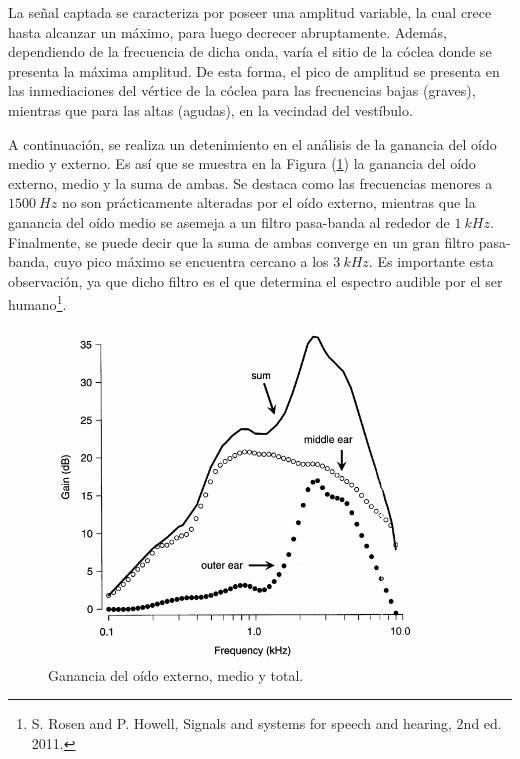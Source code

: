 \documentclass[a4paper]{article}
\begin{document}
La señal captada se caracteriza por poseer una amplitud variable, la cual crece hasta alcanzar un máximo, para luego decrecer abruptamente. Además, dependiendo de la frecuencia de dicha onda, varía el sitio de la cóclea donde se presenta la máxima amplitud. De esta forma, el pico de amplitud se presenta en las inmediaciones del vértice de la cóclea para las frecuencias bajas (graves), mientras que para las altas (agudas), en la vecindad del vestíbulo.

A continuación, se realiza un detenimiento en el análisis de la ganancia del oído medio y externo. Es así que se muestra en la Figura (\ref{fig:oidoganancia}) la ganancia del oído externo, medio y la suma de ambas. Se destaca como las frecuencias menores a $1500 \ Hz$ no son prácticamente alteradas por el oído externo, mientras que la ganancia del oído medio se asemeja a un filtro pasa-banda al rededor de $1 \ kHz$. Finalmente, se puede decir que la suma de ambas converge en un gran filtro pasa-banda, cuyo pico máximo se encuentra cercano a los $3 \ kHz$. Es importante esta observación, ya que dicho filtro es el que determina el espectro audible por el ser humano\footnote{S. Rosen and P. Howell, Signals and systems for speech and hearing, 2nd ed. 2011.}. 

\begin{figure}[H]
\centering
	\includegraphics[width=0.9\textwidth]{Imagenes/Ganancia-del-oido-externo-y-medio.png}
	\caption{Ganancia del oído externo, medio y total.}
	\label{fig:oidoganancia}
\end{figure}
\end{document}
